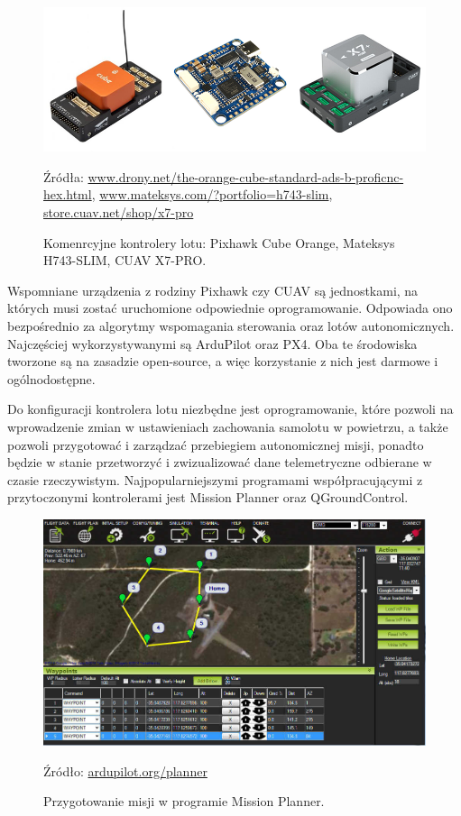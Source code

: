 \documentclass[12pt, a4paper]{article}
\begin{document}
 \begin{figure}[ht]
    \centering
    \includegraphics[width=1\textwidth]{kontrolery}
    \caption{Komenrcyjne kontrolery lotu: Pixhawk Cube Orange, Mateksys H743-SLIM, CUAV X7-PRO.}
    \small Źródła: \url{www.drony.net/the-orange-cube-standard-ads-b-proficnc-hex.html}, \url{www.mateksys.com/?portfolio=h743-slim}, \url{store.cuav.net/shop/x7-pro}
    \label{fig:kontrolery}
\end{figure}

Wspomniane urządzenia z rodziny Pixhawk czy CUAV są jednostkami, na których musi zostać uruchomione odpowiednie oprogramowanie. Odpowiada ono bezpośrednio za algorytmy wspomagania sterowania oraz lotów autonomicznych. Najczęściej wykorzystywanymi są ArduPilot oraz PX4. Oba te środowiska tworzone są na zasadzie open-source, a więc korzystanie z nich jest darmowe i ogólnodostępne. 

Do konfiguracji kontrolera lotu niezbędne jest oprogramowanie, które pozwoli na wprowadzenie zmian w ustawieniach zachowania samolotu w powietrzu, a także pozwoli przygotować i zarządzać przebiegiem autonomicznej misji, ponadto będzie w stanie przetworzyć i zwizualizować dane telemetryczne odbierane w czasie rzeczywistym. Najpopularniejszymi programami współpracującymi z przytoczonymi kontrolerami jest Mission Planner oraz QGroundControl.

\begin{figure}[ht]
    \centering
    \includegraphics[width=1\textwidth]{missionplanner}
    \caption{Przygotowanie misji w programie Mission Planner.}
    \small Źródło: \url{ardupilot.org/planner}
    \label{fig:missionplanner}
\end{figure}
\end{document}
